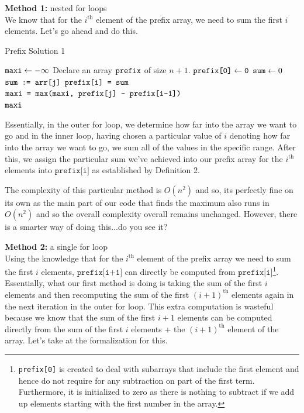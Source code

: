\noindent \textbf{Method 1:} nested for loops \\ 

\noindent We know that for the $i^\text{th}$ element of the prefix array, we need to sum the first $i$ elements. Let's go ahead and do this.

\begin{algorithm}
\caption{Prefix Solution 1}\label{prefix}
\begin{algorithmic}[1]
\State $\texttt{maxi} \gets -\infty$ 
\State Declare an array $\texttt{prefix}$ of size $n+1$.
\State $\texttt{prefix[0]} \gets \texttt{0}$ 
    \State $\texttt{sum} \gets 0$
        \State $\texttt{sum := arr[j]}$
    \EndFor
    \State $\texttt{prefix[i] = sum}$
\EndFor
{}
        \State $\texttt{maxi = max(maxi, prefix[j] - prefix[i-1])}$
    \EndFor
\EndFor 
\State \\ \Return $\texttt{maxi}$
\end{algorithmic}
\end{algorithm}

\noindent Essentially, in the outer for loop, we determine how far into the array we want to go and in the inner loop, having chosen a particular value of $i$ denoting how far into the array we want to go, we sum all of the values in the specific range. After this, we assign the particular sum we've achieved into our prefix array for the $i^\text{th}$ elements into $\texttt{prefix[i]}$ as established by Definition 2. \newline

\noindent The complexity of this particular method is $O(n^2)$ and so, its perfectly fine on its own as the main part of our code that finds the maximum also runs in $O(n^2)$ and so the overall complexity overall remains unchanged. However, there is a smarter way of doing this...do you see it? \newline

\noindent \textbf{Method 2:} a single for loop \\ 

\noindent Using the knowledge that for the $i^\text{th}$ element of the prefix array we need to sum the first $i$ elements, $\texttt{prefix[i+1]}$ can directly be computed from $\texttt{prefix[i]}$\footnote{\texttt{prefix[0]} is created to deal with subarrays that include the first element and hence do not require for any subtraction on part of the first term. Furthermore, it is initialized to zero as there is nothing to subtract if we add up elements starting with the first number in the array.}. Essentially, what our first method is doing is taking the sum of the first $i$ elements and then recomputing the sum of the first $(i+1)^{\text{th}}$ elements again in the next iteration in the outer for loop. This extra computation is wasteful because we know that the sum of the first $i+1$ elements can be computed directly from the sum of the first $i$ elements + the $(i+1)^{\text{th}}$ element of the array. Let's take at the formalization for this. \newline 

